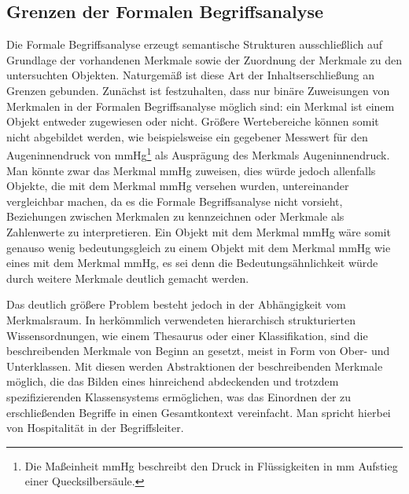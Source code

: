 \documentclass[pagesize,paper=A4,DIV=calc,fontsize=12pt,draft=false]{scrreprt}
\begin{document}
\label{fig:hasse}


\subsection{Grenzen der Formalen Begriffsanalyse}

Die Formale Begriffsanalyse erzeugt semantische Strukturen ausschließlich auf Grundlage der vorhandenen Merkmale sowie der Zuordnung der Merkmale zu den untersuchten Objekten. 
Naturgemäß ist diese Art der Inhaltserschließung an Grenzen gebunden. 
Zunächst ist festzuhalten, dass nur binäre Zuweisungen von Merkmalen in der Formalen Begriffsanalyse möglich sind: ein Merkmal ist einem Objekt entweder zugewiesen oder nicht. 
Größere Wertebereiche können somit nicht abgebildet werden, wie beispielsweise ein gegebener Messwert für den Augeninnendruck von \unit[17]{mmHg}\footnote{Die Maßeinheit \unit[]{mmHg} beschreibt den Druck in Flüssigkeiten in \unit[]{mm} Aufstieg einer Quecksilbersäule.} als Ausprägung des Merkmals Augeninnendruck. 
Man könnte zwar das Merkmal \unit[17]{mmHg} zuweisen, dies würde jedoch allenfalls Objekte, die mit dem Merkmal \unit[17]{mmHg} versehen wurden, untereinander vergleichbar machen, da es die Formale Begriffsanalyse nicht vorsieht, Beziehungen zwischen Merkmalen zu kennzeichnen oder Merkmale als Zahlenwerte zu interpretieren. 
Ein Objekt mit dem Merkmal \unit[16]{mmHg} wäre somit genauso wenig bedeutungsgleich zu einem Objekt mit dem Merkmal \unit[17]{mmHg} wie eines mit dem Merkmal \unit[6] {mmHg}, es sei denn die Bedeutungsähnlichkeit würde durch weitere Merkmale deutlich gemacht werden. 

Das deutlich größere Problem besteht jedoch in der Abhängigkeit vom Merkmalsraum. 
In herkömmlich verwendeten hierarchisch strukturierten Wissensordnungen, wie einem Thesaurus oder einer Klassifikation, sind die beschreibenden Merkmale von Beginn an gesetzt, meist in Form von Ober- und Unterklassen. 
Mit diesen werden Abstraktionen der beschreibenden Merkmale möglich, die das Bilden eines hinreichend abdeckenden und trotzdem spezifizierenden Klassensystems ermöglichen, was das Einordnen der zu erschließenden Begriffe in einen Gesamtkontext vereinfacht. 
Man spricht hierbei von Hospitalität in der Begriffsleiter. 
\end{document}
